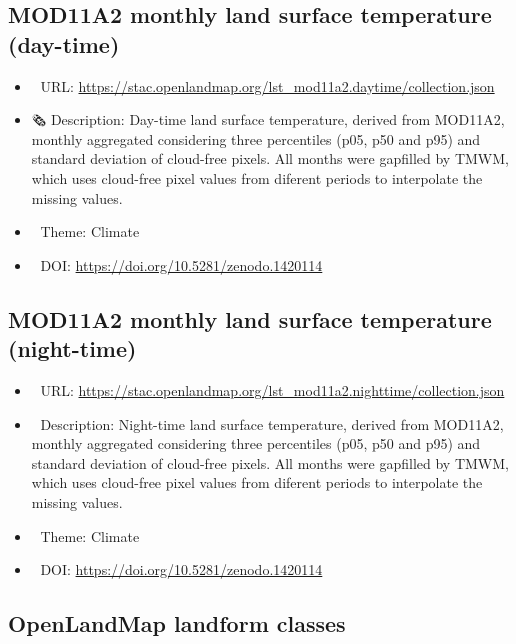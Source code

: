 \documentclass[
  graybox,natbib,nospthms]{svmono}
\providecommand{\tightlist}{%
  \setlength{\itemsep}{0pt}\setlength{\parskip}{0pt}}
\providecommand{\tightlist}{\setlength{\itemsep}{0pt}\setlength{\parskip}{0pt}}
\begin{document}
\hypertarget{mod11a2-monthly-land-surface-temperature-day-time}{%
\subsection{MOD11A2 monthly land surface temperature (day-time)}\label{mod11a2-monthly-land-surface-temperature-day-time}}

\begin{itemize}
\tightlist
\item
  🔗 URL: \url{https://stac.openlandmap.org/lst_mod11a2.daytime/collection.json}
\item
  🗞 Description: Day-time land surface temperature, derived from MOD11A2, monthly aggregated considering three percentiles (p05, p50 and p95) and standard deviation of cloud-free pixels. All months were gapfilled by TMWM, which uses cloud-free pixel values from diferent periods to interpolate the missing values.
\item
  📝 Theme: Climate
\item
  📂 DOI: \url{https://doi.org/10.5281/zenodo.1420114}
\end{itemize}

\hypertarget{mod11a2-monthly-land-surface-temperature-night-time}{%
\subsection{MOD11A2 monthly land surface temperature (night-time)}\label{mod11a2-monthly-land-surface-temperature-night-time}}

\begin{itemize}
\tightlist
\item
  🔗 URL: \url{https://stac.openlandmap.org/lst_mod11a2.nighttime/collection.json}
\item
  📰 Description: Night-time land surface temperature, derived from MOD11A2, monthly aggregated considering three percentiles (p05, p50 and p95) and standard deviation of cloud-free pixels. All months were gapfilled by TMWM, which uses cloud-free pixel values from diferent periods to interpolate the missing values.
\item
  📝 Theme: Climate
\item
  📂 DOI: \url{https://doi.org/10.5281/zenodo.1420114}
\end{itemize}

\hypertarget{openlandmap-landform-classes}{%
\subsection{OpenLandMap landform classes}\label{openlandmap-landform-classes}}
\end{document}
